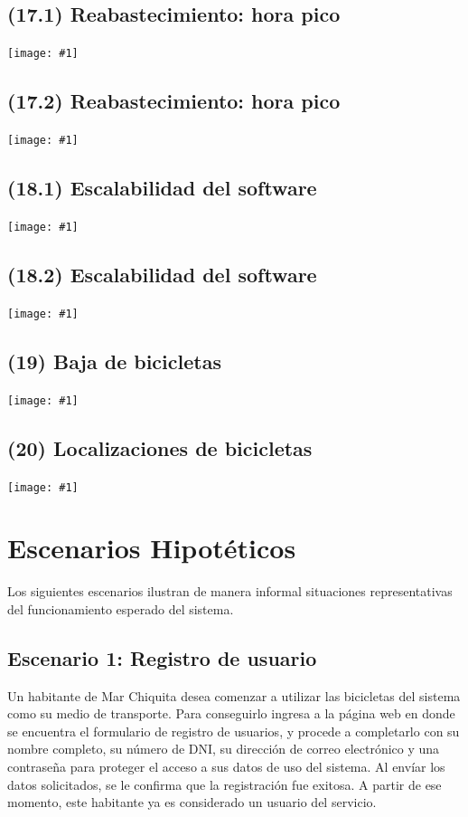 \documentclass[a4paper, 10pt, twoside]{article}
\newcommand{\diagrama}[1]{
  \texttt{[image: \#1]}
}
\begin{document}
\subsection{(17.1) Reabastecimiento: hora pico}
\diagrama{objetivos-17.1}

\subsection{(17.2) Reabastecimiento: hora pico}
\diagrama{objetivos-17.2}

\subsection{(18.1) Escalabilidad del software}
\diagrama{objetivos-18.1}

\subsection{(18.2) Escalabilidad del software}
\diagrama{objetivos-18.2}

\subsection{(19)   Baja de bicicletas}
\diagrama{objetivos-19}

\subsection{(20)   Localizaciones de bicicletas}
\diagrama{objetivos-20}




\section{Escenarios Hipotéticos}


Los siguientes escenarios ilustran de manera informal situaciones representativas del funcionamiento esperado del sistema.


\subsection{Escenario 1: Registro de usuario}

Un habitante de Mar Chiquita desea comenzar a utilizar las bicicletas del sistema como su medio de transporte. Para conseguirlo ingresa a la página web en donde se encuentra el formulario de registro de usuarios, y procede a completarlo con su nombre completo, su número de DNI, su dirección de correo electrónico y una contraseña para proteger el acceso a sus datos de uso del sistema. Al envíar los datos solicitados, se le confirma que la registración fue exitosa. A partir de ese momento, este habitante ya es considerado un usuario del servicio.
\end{document}
